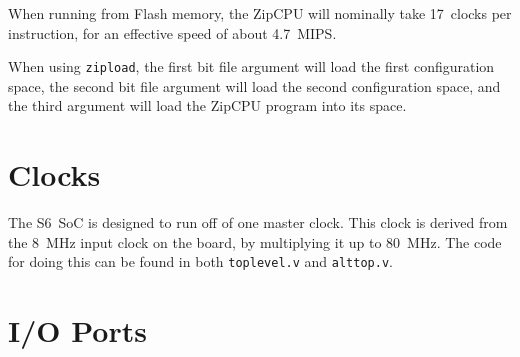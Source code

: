 \documentclass{gqtekspec}
\begin{document}
When running from Flash memory, the ZipCPU will nominally take 17~clocks per
instruction, for an effective speed of about 4.7~MIPS.

When using {\tt zipload}, the first bit file argument will load the first
configuration space, the second bit file argument will load the second
configuration space, and the third argument will load the ZipCPU program
into its space.

\chapter{Clocks}

The S6~SoC is designed to run off of one master clock.  This clock is derived
from the 8~MHz input clock on the board, by multiplying it up to 80~MHz.  The
code for doing this can be found in both {\tt toplevel.v} and {\tt alttop.v}.

\chapter{I/O Ports}
\end{document}

